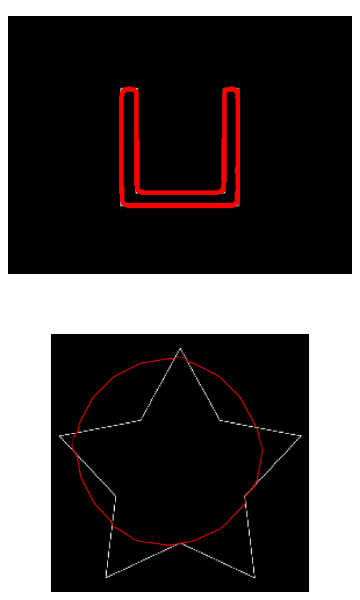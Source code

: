 \begin{figure}[H]
\begin{subfigure}[c]{0.3\linewidth}
\includegraphics[width=\textwidth]{Chapters/Images/Conc/vfcsq}
\caption{}
\end{subfigure}
\\
\begin{subfigure}[c]{0.3\linewidth}
\centering
\includegraphics[width=\textwidth]{Chapters/Images/Conc/star}
\caption{}
\end{subfigure}
\begin{subfigure}[c]{0.3\linewidth}
\centering

\end{subfigure}
\end{figure}
